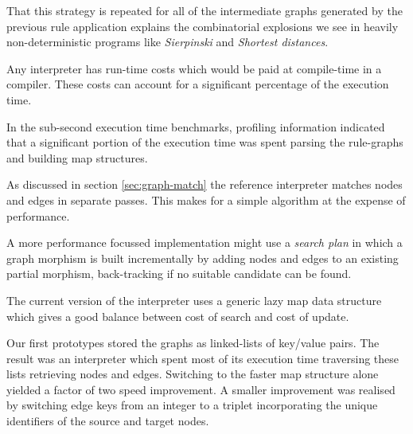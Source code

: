 That this strategy is repeated for all of the intermediate graphs generated by the previous rule application explains the combinatorial explosions we see in heavily non-deterministic programs like \textit{Sierpinski} and \textit{Shortest distances}.


Any interpreter has run-time costs which would be paid at compile-time in a compiler. These costs can account for a significant percentage of the execution time.

In the sub-second execution time benchmarks, profiling information indicated that a significant portion of the execution time was spent parsing the rule-graphs and building map structures.



As discussed in section \ref{sec:graph-match} the reference interpreter matches nodes and edges in separate passes. This makes for a simple algorithm at the expense of performance.

A more performance focussed implementation might use a \textit{search plan}\cite{Horvath-Varro07} in which a graph morphism is built incrementally by adding nodes and edges to an existing partial morphism, back-tracking if no suitable candidate can be found.



The current version of the interpreter uses a generic lazy map data structure which gives a good balance between cost of search and cost of update. 

Our first prototypes stored the graphs as linked-lists of key/value pairs. The result was an interpreter which spent most of its execution time traversing these lists retrieving nodes and edges. Switching to the faster map structure alone yielded a factor of two speed improvement. A smaller improvement was realised by switching edge keys from an integer to a triplet incorporating the unique identifiers of the source and target nodes.

